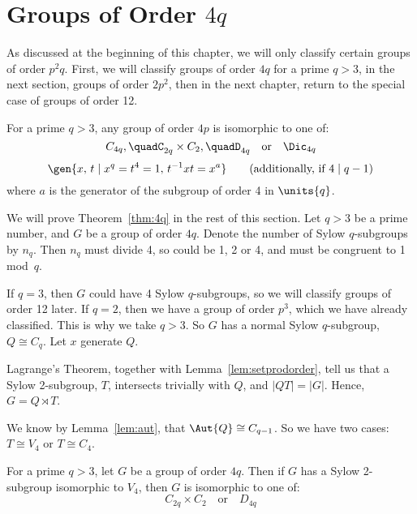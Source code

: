 \section{Groups of Order \(4q\)}
As discussed at the beginning of this chapter, we will only classify certain groups of order \(p^2 q\).
First, we will classify groups of order \(4q\) for a prime \(q > 3\), in the next section, groups of order \(2p^2\),
then in the next chapter, return to the special case of groups of order 12.

\begin{theorem}\label{thm:4q}
    For a prime \(q > 3\), any group of order \(4p\) is isomorphic to one of:
    \[%
        C_{4q}, \quad%
        C_{2q} \times C_2, \quad%
        D_{4q} \quad \text{or} \quad%
        \Dic_{4q}
    \]
    \[
        \gen{x,\, t \mid x^q = t^4 = 1,\, t^{-1}xt = x^a} \tag{additionally, if \(4 \mid q-1\)}
    \]
    where \(a\) is the generator of the subgroup of order 4 in \(\units{q}\).
\end{theorem}

We will prove Theorem~\ref{thm:4q} in the rest of this section.
Let \(q > 3\) be a prime number, and \(G\) be a group of order \(4q\).
Denote the number of Sylow \(q\)-subgroups by \(n_q\).
Then \(n_q\) must divide 4, so could be 1, 2 or 4, and must be congruent to 1 mod~\(q\).

If \(q = 3\), then \(G\) could have 4 Sylow \(q\)-subgroups, so we will classify groups of order 12 later.
If \(q = 2\), then we have a group of order \(p^3\), which we have already classified.
This is why we take \(q > 3\).
So \(G\) has a normal Sylow \(q\)-subgroup, \(Q \cong C_q\).
Let \(x\) generate \(Q\).

Lagrange's Theorem, together with Lemma~\ref{lem:setprodorder}, tell us that a Sylow 2-subgroup, \(T\), intersects
trivially with \(Q\), and \(|QT| = |G|\).
Hence, \(G = Q \rtimes T\).

We know by Lemma~\ref{lem:aut}, that \(\Aut{Q} \cong C_{q-1}\).
So we have two cases: \(T \cong V_4\) or \(T \cong C_4\).

\begin{lemma}
    For a prime \(q > 3\), let \(G\) be a group of order \(4q\).
    Then if \(G\) has a Sylow 2-subgroup isomorphic to \(V_{4}\), then \(G\) is isomorphic to one of:
    \[%
        C_{2q} \times C_2 \quad \text{or} \quad%
        D_{4q}%
    \]
\end{lemma}

